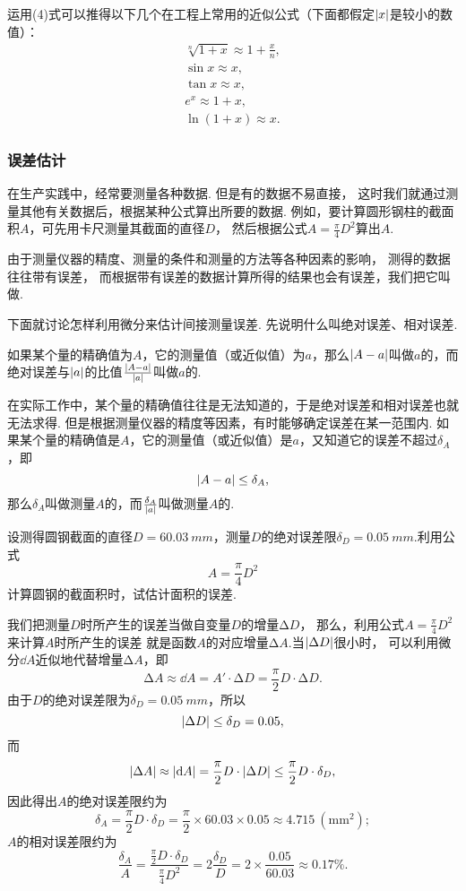 运用(4)式可以推得以下几个在工程上常用的近似公式（下面都假定\(\abs{x}\)是较小的数值）：
\begin{gather}
\sqrt[n]{1+x} \approx 1 + \frac{x}{n}, \\
\sin x \approx x, \\
\tan x \approx x, \\
e^x \approx 1 + x, \\
\ln (1 + x) \approx x.
\end{gather}

\subsubsection{误差估计}
在生产实践中，经常要测量各种数据.
但是有的数据不易直接，
这时我们就通过测量其他有关数据后，根据某种公式算出所要的数据.
例如，要计算圆形钢柱的截面积\(A\)，可先用卡尺测量其截面的直径\(D\)，
然后根据公式\(A = \frac{\pi}{4} D^2\)算出\(A\).

由于测量仪器的精度、测量的条件和测量的方法等各种因素的影响，
测得的数据往往带有误差，
而根据带有误差的数据计算所得的结果也会有误差，我们把它叫做.

下面就讨论怎样利用微分来估计间接测量误差.
先说明什么叫绝对误差、相对误差.

如果某个量的精确值为\(A\)，它的测量值（或近似值）为\(a\)，那么\(\abs{A-a}\)叫做\(a\)的，而绝对误差与\(\abs{a}\)的比值\(\frac{\abs{A-a}}{\abs{a}}\)叫做\(a\)的.

在实际工作中，某个量的精确值往往是无法知道的，于是绝对误差和相对误差也就无法求得.
但是根据测量仪器的精度等因素，有时能够确定误差在某一范围内.
如果某个量的精确值是\(A\)，它的测量值（或近似值）是\(a\)，又知道它的误差不超过\(\delta_A\)，即\[
\abs{A-a} \leq \delta_A,
\]那么\(\delta_A\)叫做测量\(A\)的，而\(\frac{\delta_A}{\abs{a}}\)叫做测量\(A\)的.

\begin{example}
设测得圆钢截面的直径\(D = 60.03\ mm\)，测量\(D\)的绝对误差限\(\delta_D = 0.05\ mm\).利用公式\[
A = \frac{\pi}{4} D^2
\]计算圆钢的截面积时，试估计面积的误差.
\begin{solution}
我们把测量\(D\)时所产生的误差当做自变量\(D\)的增量\(\increment D\)，
那么，利用公式\(A = \frac{\pi}{4} D^2\)来计算\(A\)时所产生的误差
就是函数\(A\)的对应增量\(\increment A\).当\(\abs{\Delta D}\)很小时，
可以利用微分\(\dd{A}\)近似地代替增量\(\increment A\)，即\[
\increment A \approx \dd{A} = A' \cdot \increment D = \frac{\pi}{2} D \cdot \increment D.
\]由于\(D\)的绝对误差限为\(\delta_D = 0.05\ mm\)，所以\[
\abs{\Delta D} \leq \delta_D = 0.05,
\]而\[
\abs{\Delta A} \approx \abs{\dd{A}} = \frac{\pi}{2} D \cdot \abs{\Delta D} \leq \frac{\pi}{2} D \cdot \delta_D,
\]因此得出\(A\)的绝对误差限约为\[
\delta_A = \frac{\pi}{2} D \cdot \delta_D = \frac{\pi}{2} \times 60.03 \times 0.05 \approx 4.715\ (\mathrm{mm}^2);
\]\(A\)的相对误差限约为\[
\frac{\delta_A}{A} = \frac{\frac{\pi}{2} D \cdot \delta_D}{\frac{\pi}{4} D^2}
= 2 \frac{\delta_D}{D} = 2 \times \frac{0.05}{60.03} \approx 0.17\%.
\]
\end{solution}
\end{example}

